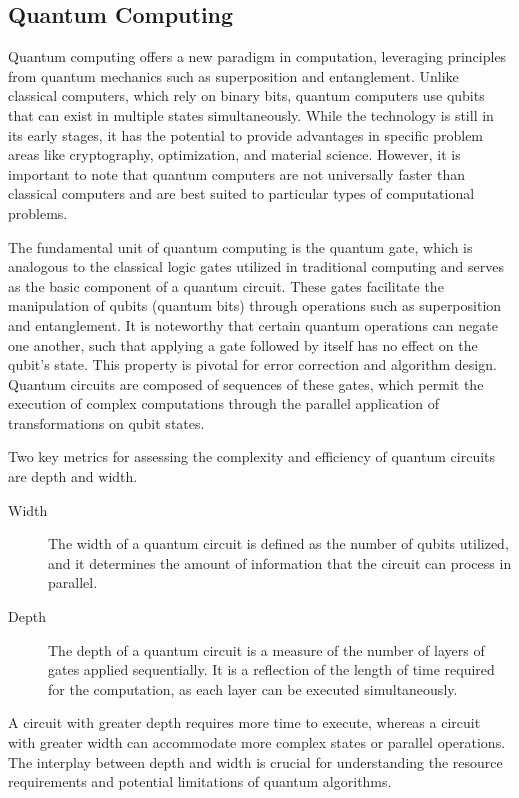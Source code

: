 \subsection{Quantum Computing}
\label{sec:bg:qc}
Quantum computing offers a new paradigm in computation, leveraging principles from quantum mechanics such as superposition and entanglement. 
Unlike classical computers, which rely on binary bits, quantum computers use qubits that can exist in multiple states simultaneously. 
While the technology is still in its early stages, it has the potential to provide advantages in specific problem areas like cryptography, optimization, and material science. 
However, it is important to note that quantum computers are not universally faster than classical computers and are best suited to particular types of computational problems.

The fundamental unit of quantum computing is the quantum gate, which is analogous to the classical logic gates utilized in traditional computing and serves as the basic component of a quantum circuit.
These gates facilitate the manipulation of qubits (quantum bits) through operations such as superposition and entanglement. 
It is noteworthy that certain quantum operations can negate one another, such that applying a gate followed by itself has no effect on the qubit's state. 
This property is pivotal for error correction and algorithm design.
Quantum circuits are composed of sequences of these gates, which permit the execution of complex computations through the parallel application of transformations on qubit states.

Two key metrics for assessing the complexity and efficiency of quantum circuits are depth and width.
\begin{description}
    \item[Width] The width of a quantum circuit is defined as the number of qubits utilized, and it determines the amount of information that the circuit can process in parallel.
    \item[Depth] The depth of a quantum circuit is a measure of the number of layers of gates applied sequentially.
    It is a reflection of the length of time required for the computation, as each layer can be executed simultaneously. 
\end{description}
A circuit with greater depth requires more time to execute, whereas a circuit with greater width can accommodate more complex states or parallel operations. 
The interplay between depth and width is crucial for understanding the resource requirements and potential limitations of quantum algorithms.

